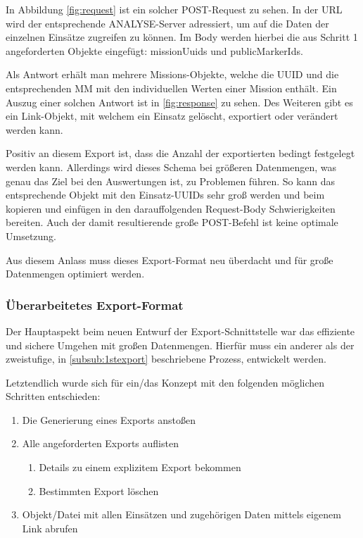 In Abbildung \ref{fig:request} ist ein solcher POST-Request zu sehen.
In der URL wird der entsprechende \gls{ANALYSE}-Server adressiert, um auf die Daten der einzelnen Einsätze zugreifen zu können.
Im Body werden hierbei die aus Schritt 1 angeforderten Objekte eingefügt: \glqq missionUuids\grqq{} und \glqq publicMarkerIds\grqq.

Als Antwort erhält man mehrere \glqq Missions-Objekte\grqq{}, welche die \gls{UUID} und die entsprechenden \gls{MM} mit den individuellen Werten einer Mission enthält.
Ein Auszug einer solchen Antwort ist in \ref{fig:response} zu sehen.
Des Weiteren gibt es ein \glqq Link-Objekt\grqq{}, mit welchem ein Einsatz gelöscht, exportiert oder verändert werden kann. 

Positiv an diesem Export ist, dass die Anzahl der exportierten bedingt festgelegt werden kann.
Allerdings wird dieses Schema bei größeren Datenmengen, was genau das Ziel bei den Auswertungen ist, zu Problemen führen.
So kann das entsprechende Objekt mit den Einsatz-\gls{UUID}s sehr groß werden und beim kopieren und einfügen in den darauffolgenden Request-Body Schwierigkeiten bereiten.
Auch der damit resultierende große POST-Befehl ist keine optimale Umsetzung.

Aus diesem Anlass muss dieses Export-Format neu überdacht und für große Datenmengen optimiert werden.

\subsubsection{Überarbeitetes Export-Format}
\label{subsub:ueberarbeutetesformat}
Der Hauptaspekt beim neuen Entwurf der Export-Schnittstelle war das effiziente und sichere Umgehen mit großen Datenmengen.
Hierfür muss ein anderer als der zweistufige, in \ref{subsub:1stexport} beschriebene Prozess, entwickelt werden.


Letztendlich wurde sich für ein/das Konzept mit den folgenden möglichen Schritten entschieden:
\begin{enumerate}
\item Die Generierung eines Exports anstoßen
\item Alle angeforderten Exports auflisten
	\begin{enumerate}
	\item Details zu einem explizitem Export bekommen
	\item Bestimmten Export löschen
	\end{enumerate}
\item Objekt/Datei mit allen Einsätzen und zugehörigen Daten mittels eigenem Link abrufen
\end{enumerate} 

